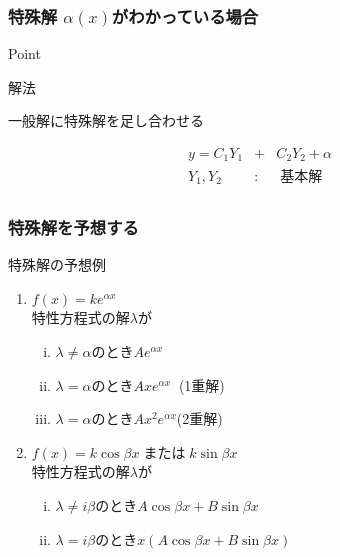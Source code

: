 \documentclass[a4paper]{jsarticle}
\begin{document}
\subsubsection{特殊解 $\alpha\left(x\right)$がわかっている場合}
\begin{itembox}[l]{Point}
    \begin{center}
    \end{center}
\end{itembox}
\begin{itembox}[l]{解法}
    \begin{center}
        一般解に特殊解を足し合わせる
    \end{center}
    \begin{eqnarray*}
        y=C_1Y_1&+&C_2Y_2+\alpha\\
        Y_1,Y_2\;&:&\;基本解\\
    \end{eqnarray*}
\end{itembox}
\subsubsection{特殊解を予想する}
\begin{itembox}[l]{特殊解の予想例}
    \begin{enumerate}[(1)]
        \item $f\left(x\right)=ke^{\alpha x}$\\
              特性方程式の解$\lambda$が
              \begin{enumerate}[(i)]
                  \item $\lambda \neq \alpha$\quad のとき\quad$Ae^{\alpha x}$
                  \item $\lambda = \alpha$\quad のとき\quad$Axe^{\alpha x}\;\;$\quad(1重解)
                  \item $\lambda = \alpha$\quad のとき\quad$Ax^2e^{\alpha x}$\quad(2重解)
              \end{enumerate}
        \item $f\left(x\right)=k\cos\beta x\;$または$\;k\sin\beta x$\\
              特性方程式の解$\lambda$が
              \begin{enumerate}[(i)]
                  \item $\lambda \neq i\beta$\quad のとき\quad$A\cos\beta x+B\sin\beta x$
                  \item $\lambda = i\beta$\quad のとき\quad$x\left(A\cos\beta x+B\sin\beta x\right)$
              \end{enumerate}
    \end{enumerate}
\end{itembox}
\end{document}
